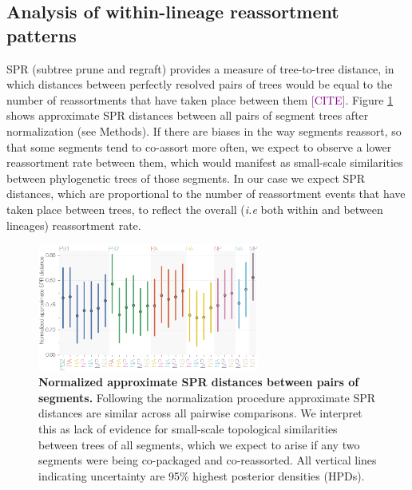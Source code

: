 \documentclass[11pt,oneside,letterpaper]{article}
\def\tbc#1{\textcolor{purple}{[#1]}}
\begin{document}
\subsection*{Analysis of within-lineage reassortment patterns}
SPR (subtree prune and regraft) provides a measure of tree-to-tree distance, in which distances between perfectly resolved pairs of trees would be equal to the number of reassortments that have taken place between them \tbc{CITE}.
Figure \ref{SPRdistances} shows approximate SPR distances between all pairs of segment trees after normalization (see Methods).
If there are biases in the way segments reassort, so that some segments tend to co-assort more often, we expect to observe a lower reassortment rate between them, which would manifest as small-scale similarities between phylogenetic trees of those segments.
In our case we expect SPR distances, which are proportional to the number of reassortment events that have taken place between trees, to reflect the overall (\textit{i.e} both within and between lineages) reassortment rate.

\begin{figure}[h]
	\centering		
	\includegraphics[width=0.65\textwidth]{figures/InfB_normalizedApproxSPR.png}
	\caption{\textbf{Normalized approximate SPR distances between pairs of segments.}
Following the normalization procedure approximate SPR distances are similar across all pairwise comparisons.
We interpret this as lack of evidence for small-scale topological similarities between trees of all segments, which we expect to arise if any two segments were being co-packaged and co-reassorted.
All vertical lines indicating uncertainty are 95\% highest posterior densities (HPDs).}
	\label{SPRdistances}
\end{figure}
\end{document}
